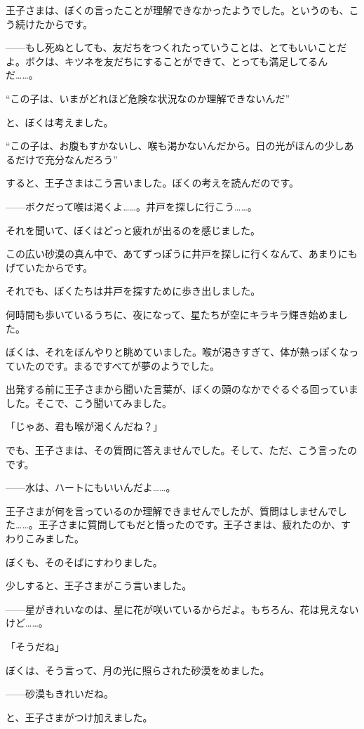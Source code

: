 王子さまは、ぼくの言ったことが理解できなかったようでした。というのも、こう続けたからです。

——もし死ぬとしても、友だちをつくれたっていうことは、とてもいいことだよ。ボクは、キツネを友だちにすることができて、とっても満足してるんだ……。

“この子は、いまがどれほど危険な状況なのか理解できないんだ”

と、ぼくは考えました。

“この子は、お腹もすかないし、喉も渇かないんだから。日の光がほんの少しあるだけで充分なんだろう”

すると、王子さまはこう言いました。ぼくの考えを読んだのです。

——ボクだって喉は渇くよ……。井戸を探しに行こう……。

それを聞いて、ぼくはどっと疲れが出るのを感じました。

この広い砂漠の真ん中で、あてずっぽうに井戸を探しに行くなんて、あまりにもげていたからです。

それでも、ぼくたちは井戸を探すために歩き出しました。

何時間も歩いているうちに、夜になって、星たちが空にキラキラ輝き始めました。

ぼくは、それをぼんやりと眺めていました。喉が渇きすぎて、体が熱っぽくなっていたのです。まるですべてが夢のようでした。

出発する前に王子さまから聞いた言葉が、ぼくの頭のなかでぐるぐる回っていました。そこで、こう聞いてみました。

「じゃあ、君も喉が渇くんだね？」

でも、王子さまは、その質問に答えませんでした。そして、ただ、こう言ったのです。

——水は、ハートにもいいんだよ……。

王子さまが何を言っているのか理解できませんでしたが、質問はしませんでした……。王子さまに質問してもだと悟ったのです。王子さまは、疲れたのか、すわりこみました。

ぼくも、そのそばにすわりました。

少しすると、王子さまがこう言いました。

——星がきれいなのは、星に花が咲いているからだよ。もちろん、花は見えないけど……。

「そうだね」

ぼくは、そう言って、月の光に照らされた砂漠をめました。

——砂漠もきれいだね。

と、王子さまがつけ加えました。

